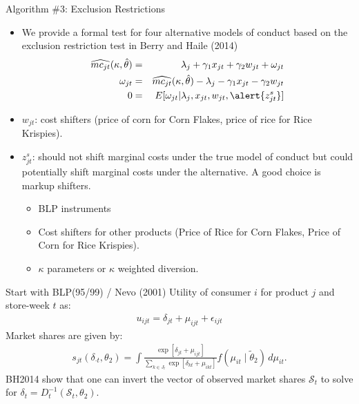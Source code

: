 \documentclass[xcolor=pdftex,dvipsnames,table,mathserif,aspectratio=169]{beamer}
\begin{document}
\begin{frame}{\normalsize Algorithm \#3: Exclusion Restrictions}
\small
\begin{itemize}
\item We provide a formal test for four alternative models of conduct based on the exclusion restriction test in Berry and Haile (2014) 
\begin{eqnarray*}
\widehat{mc_{jt}}(\kappa,\hat{\theta}) &=& \lambda_j +  \gamma_1 x_{jt} + \gamma_2 w_{jt} + \omega_{jt}\\
\omega_{jt} &=& \widehat{mc_{jt}}(\kappa,\hat{\theta}) - \lambda_j -  \gamma_1 x_{jt} - \gamma_2 w_{jt} \\
0 &=& E[ \omega_{jt} | \lambda_j, x_{jt}, w_{jt}, \alert{z_{jt}^s}]
\end{eqnarray*}
\item $w_{jt}$: cost shifters (price of corn for Corn Flakes, price of rice for Rice Krispies).
\item $z_{jt}^s$: should \alert{not} shift marginal costs under the true model of conduct but could potentially shift marginal costs under the alternative. A good choice is \alert{markup shifters}.
\begin{itemize}
\item BLP instruments
\item Cost shifters for other products (Price of Rice for Corn Flakes, Price of Corn for Rice Krispies).
\item $\kappa$ parameters or $\kappa$ weighted diversion.
\end{itemize}
\end{itemize}
\end{frame}

\begin{frame}{Start with BLP(95/99) / Nevo (2001)}
Utility of consumer $i$ for product $j$ and store-week $t$ as:
\begin{align*}
    u_{ijt} = \delta_{jt}+ \mu_{ijt}+  \epsilon_{ijt}
\end{align*}
Market shares are given by:
\begin{align*}
    s_{jt}(\delta_{\cdot t},\theta_2) = \int \frac{\exp[ \delta_{jt} + \mu_{ijt} ]}{\sum_{k \in J_t} \exp[ \delta_{kt} + \mu_{ikt} ]} f(\mu_{it} \mid \widetilde{\theta}_2) \, d\mu_{it}.
\end{align*}
BH2014 show that one can invert the vector of observed market shares $\mathcal{S}_t$ to solve for $\delta_{t}=D_{t}^{-1}(\mathcal{S}_t, \theta_2)$.\\
\end{frame}
\end{document}

